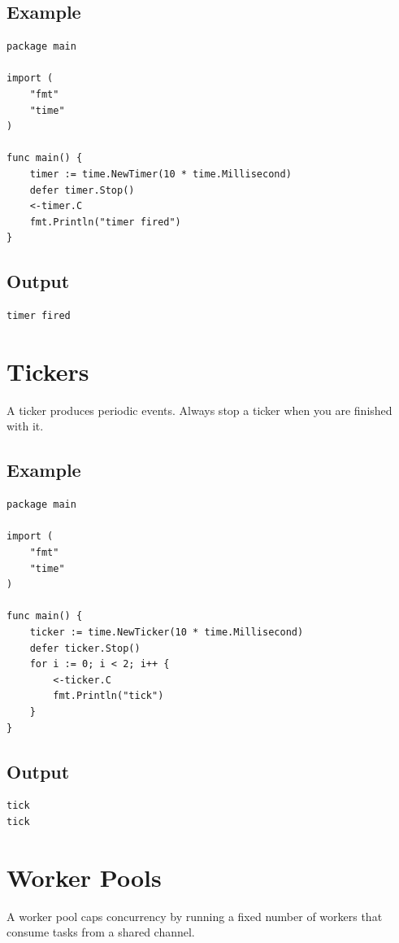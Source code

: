 \documentclass[10pt,oneside]{article}
\newcommand{\sectionline}{\par\vspace{4pt}{\color{rule}\hrule height .5pt}\vspace{7pt}\color{ink}\noindent}
\begin{document}
\subsection*{Example}
\begin{lstlisting}[style=gocode]
package main

import (
	"fmt"
	"time"
)

func main() {
	timer := time.NewTimer(10 * time.Millisecond)
	defer timer.Stop()
	<-timer.C
	fmt.Println("timer fired")
}
\end{lstlisting}
\subsection*{Output}
\begin{lstlisting}[style=terminal]
timer fired
\end{lstlisting}
\clearpage
\section{Tickers}
\sectionline
A ticker produces periodic events. Always stop a ticker when you are finished with it.\par
\subsection*{Example}
\begin{lstlisting}[style=gocode]
package main

import (
	"fmt"
	"time"
)

func main() {
	ticker := time.NewTicker(10 * time.Millisecond)
	defer ticker.Stop()
	for i := 0; i < 2; i++ {
		<-ticker.C
		fmt.Println("tick")
	}
}
\end{lstlisting}
\subsection*{Output}
\begin{lstlisting}[style=terminal]
tick
tick
\end{lstlisting}
\clearpage
\section{Worker Pools}
\sectionline
A worker pool caps concurrency by running a fixed number of workers that consume tasks from a shared channel.\par
\end{document}
